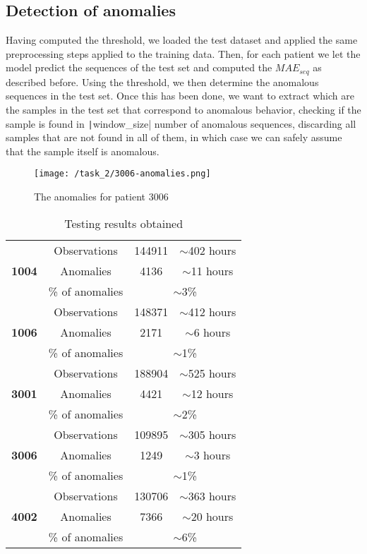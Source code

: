 \documentclass[12pt,a4paper,leqno]{article}
\begin{document}
	\subsection{Detection of anomalies}
	Having computed the threshold, we loaded the test dataset and applied the same preprocessing steps applied to the training data. Then, for each patient we let the model predict the sequences of the test set and computed the $MAE_{seq}$ as described before. Using the threshold, we then determine the anomalous sequences in the test set. Once this has been done, we want to extract which are the samples in the test set that correspond to anomalous behavior, checking if the sample is found in \texttt|window_size| number of anomalous sequences, discarding all samples that are not found in all of them, in which case we can safely assume that the sample itself is anomalous.
	\begin{figure}
		\centering
		\texttt{[image: /task\_2/3006-anomalies.png]}
		\caption{The anomalies for patient 3006}
		\label{task_2/3006-anomalies}
	\end{figure}
	\begin{table}
		\centering
		\begin{tabular}{|c|c|c|c|}
			\hline
			\multirow{3}{4em}{\textbf{1004}} & Observations & 144911 & $\sim$402 hours \\
			& Anomalies & 4136 & $\sim$11 hours \\ \cline{3-4}
			& \% of anomalies & \multicolumn{2}{|c|}{$\sim$3\%} \\
			\hline
			\hline
			\multirow{3}{4em}{\textbf{1006}} & Observations & 148371 & $\sim$412 hours \\
			& Anomalies & 2171 & $\sim$6 hours \\ \cline{3-4}
			& \% of anomalies & \multicolumn{2}{|c|}{$\sim$1\%} \\
			\hline
			\hline
			\multirow{3}{4em}{\textbf{3001}} & Observations & 188904 & $\sim$525 hours \\
			& Anomalies & 4421 & $\sim$12 hours \\ \cline{3-4}
			& \% of anomalies & \multicolumn{2}{|c|}{$\sim$2\%} \\
			\hline
			\hline
			\multirow{3}{4em}{\textbf{3006}} & Observations & 109895 & $\sim$305 hours \\
			& Anomalies & 1249 & $\sim$3 hours \\ \cline{3-4}
			& \% of anomalies & \multicolumn{2}{|c|}{$\sim$1\%} \\
			\hline
			\hline
			\multirow{3}{4em}{\textbf{4002}} & Observations & 130706 & $\sim$363 hours \\
			& Anomalies & 7366 & $\sim$20 hours \\ \cline{3-4}
			& \% of anomalies & \multicolumn{2}{|c|}{$\sim$6\%} \\
			\hline
		\end{tabular}
		\caption{Testing results obtained}
		\label{task_2/evaluations_table}
	\end{table}
\end{document}

